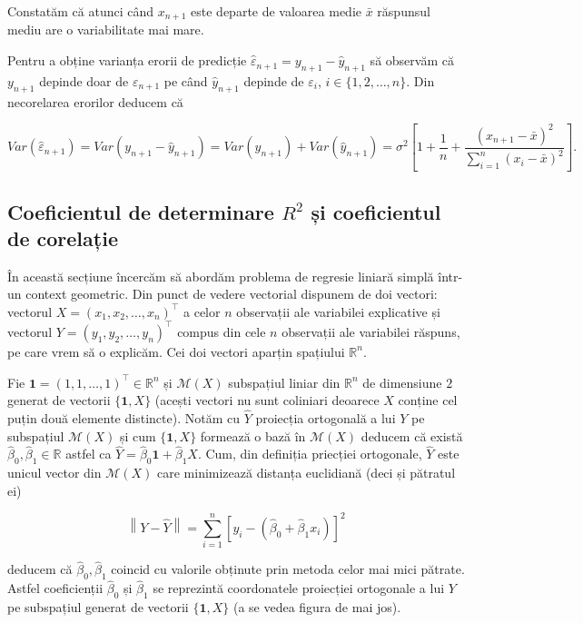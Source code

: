 \documentclass[]{article}
\newcounter{exo}[section]
\begin{document}
Constatăm că atunci când \(x_{n+1}\) este departe de valoarea medie
\(\bar x\) răspunsul mediu are o variabilitate mai mare.

Pentru a obține varianța erorii de predicție
\(\hat\varepsilon_{n+1} = y_{n+1} - \hat y_{n+1}\) să observăm că
\(y_{n+1}\) depinde doar de \(\varepsilon_{n+1}\) pe când
\(\hat y_{n+1}\) depinde de \(\varepsilon_i\), \(i\in\{1,2,\ldots,n\}\).
Din necorelarea erorilor deducem că

\[
  Var(\hat\varepsilon_{n+1}) = Var(y_{n+1} - \hat y_{n+1}) = Var(y_{n+1}) + Var(\hat y_{n+1}) = \sigma^2\left[1 + \frac{1}{n} + \frac{(x_{n+1} - \bar x)^2}{\sum_{i=1}^{n}(x_i - \bar x)^2}\right].
\]

\hypertarget{reg_sim_ex_2}{%
\subsection{\texorpdfstring{Coeficientul de determinare \(R^2\) și
coeficientul de
corelație}{Coeficientul de determinare R\^{}2 și coeficientul de corelație}}\label{reg_sim_ex_2}}

În această secțiune încercăm să abordăm problema de regresie liniară
simplă într-un context geometric. Din punct de vedere vectorial dispunem
de doi vectori: vectorul \(X = (x_1, x_2, \ldots, x_n)^\intercal\) a
celor \(n\) observații ale variabilei explicative și vectorul
\(Y = (y_1, y_2, \ldots, y_n)^\intercal\) compus din cele \(n\)
observații ale variabilei răspuns, pe care vrem să o explicăm. Cei doi
vectori aparțin spațiului \(\mathbb{R}^n\).

Fie \(\mathbf{1} = (1,1,\ldots,1)^\intercal\in\mathbb{R}^n\) și
\(\mathcal{M}(X)\) subspațiul liniar din \(\mathbb{R}^n\) de dimensiune
\(2\) generat de vectorii \(\{\mathbf{1}, X\}\) (acești vectori nu sunt
coliniari deoarece \(X\) conține cel puțin două elemente distincte).
Notăm cu \(\hat Y\) proiecția ortogonală a lui \(Y\) pe subspațiul
\(\mathcal{M}(X)\) și cum \(\{\mathbf{1}, X\}\) formează o bază în
\(\mathcal{M}(X)\) deducem că există
\(\hat\beta_0, \hat\beta_1\in \mathbb{R}\) astfel ca
\(\hat Y = \hat\beta_0\mathbf{1} + \hat\beta_1 X\). Cum, din definiția
priecției ortogonale, \(\hat Y\) este unicul vector din
\(\mathcal{M}(X)\) care minimizează distanța euclidiană (deci și
pătratul ei)

\[
\left\lVert Y - \hat Y \right\rVert = \sum_{i = 1}^{n}[y_i - (\hat\beta_0 + \hat \beta_1 x_i)]^2
\]

deducem că \(\hat\beta_0, \hat\beta_1\) coincid cu valorile obținute
prin metoda celor mai mici pătrate. Astfel coeficienții \(\hat\beta_0\)
și \(\hat\beta_1\) se reprezintă coordonatele proiecției ortogonale a
lui \(Y\) pe subspațiul generat de vectorii \(\{\mathbf{1}, X\}\) (a se
vedea figura de mai jos).
\end{document}
